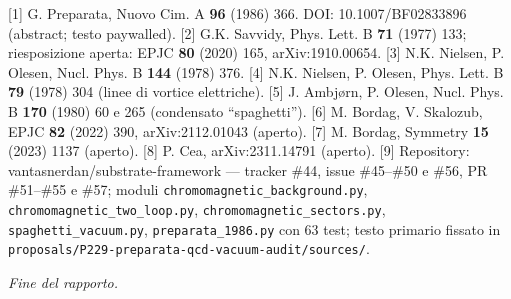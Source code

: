 \documentclass[
]{article}
\begin{document}
{[}1{]} G. Preparata, Nuovo Cim. A \textbf{96} (1986) 366. DOI:
10.1007/BF02833896 (abstract; testo paywalled). {[}2{]} G.K. Savvidy,
Phys. Lett. B \textbf{71} (1977) 133; riesposizione aperta: EPJC
\textbf{80} (2020) 165, arXiv:1910.00654. {[}3{]} N.K. Nielsen, P.
Olesen, Nucl. Phys. B \textbf{144} (1978) 376. {[}4{]} N.K. Nielsen, P.
Olesen, Phys. Lett. B \textbf{79} (1978) 304 (linee di vortice
elettriche). {[}5{]} J. Ambjørn, P. Olesen, Nucl. Phys. B \textbf{170}
(1980) 60 e 265 (condensato ``spaghetti''). {[}6{]} M. Bordag, V.
Skalozub, EPJC \textbf{82} (2022) 390, arXiv:2112.01043 (aperto).
{[}7{]} M. Bordag, Symmetry \textbf{15} (2023) 1137 (aperto). {[}8{]} P.
Cea, arXiv:2311.14791 (aperto). {[}9{]} Repository:
vantasnerdan/substrate-framework --- tracker \#44, issue \#45--\#50 e
\#56, PR \#51--\#55 e \#57; moduli
\texttt{chromomagnetic\_background.py},
\texttt{chromomagnetic\_two\_loop.py},
\texttt{chromomagnetic\_sectors.py}, \texttt{spaghetti\_vacuum.py},
\texttt{preparata\_1986.py} con 63 test; testo primario fissato in
\texttt{proposals/P229-preparata-qcd-vacuum-audit/sources/}.

\emph{Fine del rapporto.}
\end{document}
